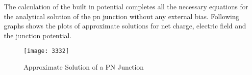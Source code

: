 \begin{doublespace}
The calculation of the built in potential completes all the necessary equations for the analytical solution of the pn junction without any external bias. Following graphs shows the plots of approximate solutions for net charge, electric field and the junction potential.

\begin{figure}
\centering
\texttt{[image: 3332]}
\caption{Approximate Solution of a PN Junction} 
\end{figure}

\end{doublespace}

